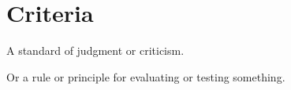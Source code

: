 \section{Criteria}
\label{sec:Criteria}

A standard of judgment or criticism. 

Or a rule or principle for evaluating or testing something.